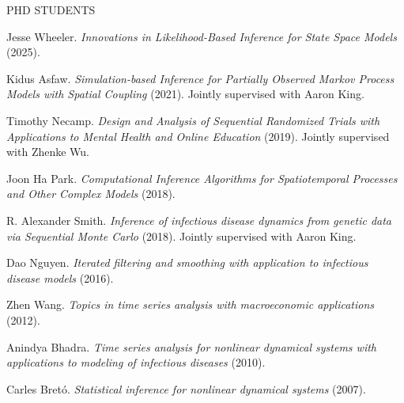 \begin{reflist}{PHD STUDENTS}

\item{Jesse Wheeler.} {\it Innovations in Likelihood-Based Inference for State Space Models} (2025).
  
\item{Kidus Asfaw.} {\it Simulation-based Inference for Partially Observed Markov Process Models with Spatial Coupling} (2021). Jointly supervised with Aaron King.

\item{Timothy Necamp.} {\it Design and Analysis of Sequential Randomized Trials with Applications to Mental Health and Online Education} (2019). Jointly supervised with Zhenke Wu. 

\item{Joon Ha Park.} {\it Computational Inference Algorithms for Spatiotemporal Processes and Other Complex Models} (2018). 

 \item{R. Alexander Smith.} {\it Inference of infectious disease dynamics from genetic data via Sequential Monte Carlo} (2018). Jointly supervised with Aaron King. 

 \item{Dao Nguyen.} {\it Iterated filtering and smoothing with application to infectious disease models} (2016). 

\item{Zhen Wang.} {\it Topics in time series analysis with macroeconomic applications} (2012). 

\item{Anindya Bhadra.} {\it Time series analysis for nonlinear dynamical systems with applications to modeling of infectious diseases} (2010).

\item{Carles Bret\'{o}.} {\it Statistical inference for nonlinear dynamical systems} (2007). 


\end{reflist}


\lsp

